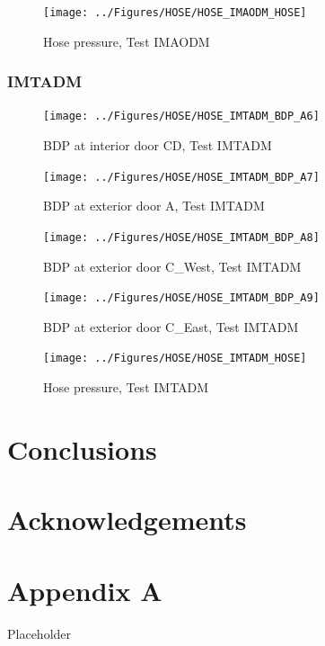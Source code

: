 \documentclass[11pt,oneside]{book}
\begin{document}
\begin{figure}[!ht]
\texttt{[image: ../Figures/HOSE/HOSE\_IMAODM\_HOSE]}
\caption{Hose pressure, Test IMAODM}
\label{fig:HOSE_IMAODM_HOSE}
\end{figure}


\clearpage


\subsection{IMTADM}

\begin{figure}[!ht]
\texttt{[image: ../Figures/HOSE/HOSE\_IMTADM\_BDP\_A6]}
\caption{BDP at interior door CD, Test IMTADM}
\label{fig:HOSE_IMTADM_BDP_A6}
\end{figure}

\begin{figure}[!ht]
\texttt{[image: ../Figures/HOSE/HOSE\_IMTADM\_BDP\_A7]}
\caption{BDP at exterior door A, Test IMTADM}
\label{fig:HOSE_IMTADM_BDP_A7}
\end{figure}

\begin{figure}[!ht]
\texttt{[image: ../Figures/HOSE/HOSE\_IMTADM\_BDP\_A8]}
\caption{BDP at exterior door C\_West, Test IMTADM}
\label{fig:HOSE_IMTADM_BDP_A8}
\end{figure}

\begin{figure}[!ht]
\texttt{[image: ../Figures/HOSE/HOSE\_IMTADM\_BDP\_A9]}
\caption{BDP at exterior door C\_East, Test IMTADM}
\label{fig:HOSE_IMTADM_BDP_A9}
\end{figure}

\begin{figure}[!ht]
\texttt{[image: ../Figures/HOSE/HOSE\_IMTADM\_HOSE]}
\caption{Hose pressure, Test IMTADM}
\label{fig:HOSE_IMTADM_HOSE}
\end{figure}


\chapter{Conclusions}
\label{chap:Conclusions}

\chapter{Acknowledgements}
\label{chap:Acknowledgements}



\appendix

\chapter{Appendix A}

Placeholder
\end{document}
